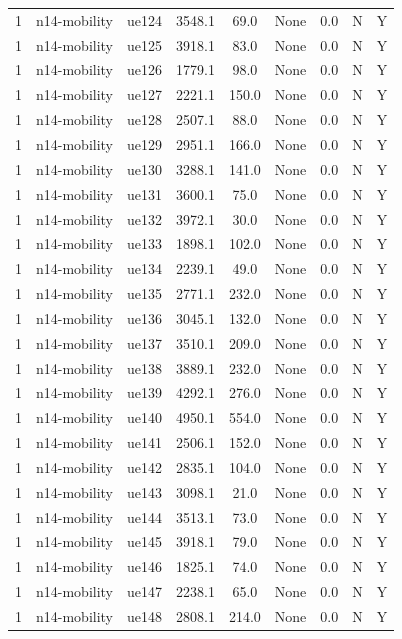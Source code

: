 \begin{table}[ht]
\begin{tabular}{|c|c|c|c|c|c|c|c|c|}
1 & n14-mobility & ue124 & 3548.1 & 69.0 & None & 0.0 & N & Y \\
1 & n14-mobility & ue125 & 3918.1 & 83.0 & None & 0.0 & N & Y \\
1 & n14-mobility & ue126 & 1779.1 & 98.0 & None & 0.0 & N & Y \\
1 & n14-mobility & ue127 & 2221.1 & 150.0 & None & 0.0 & N & Y \\
1 & n14-mobility & ue128 & 2507.1 & 88.0 & None & 0.0 & N & Y \\
1 & n14-mobility & ue129 & 2951.1 & 166.0 & None & 0.0 & N & Y \\
1 & n14-mobility & ue130 & 3288.1 & 141.0 & None & 0.0 & N & Y \\
1 & n14-mobility & ue131 & 3600.1 & 75.0 & None & 0.0 & N & Y \\
1 & n14-mobility & ue132 & 3972.1 & 30.0 & None & 0.0 & N & Y \\
1 & n14-mobility & ue133 & 1898.1 & 102.0 & None & 0.0 & N & Y \\
1 & n14-mobility & ue134 & 2239.1 & 49.0 & None & 0.0 & N & Y \\
1 & n14-mobility & ue135 & 2771.1 & 232.0 & None & 0.0 & N & Y \\
1 & n14-mobility & ue136 & 3045.1 & 132.0 & None & 0.0 & N & Y \\
1 & n14-mobility & ue137 & 3510.1 & 209.0 & None & 0.0 & N & Y \\
1 & n14-mobility & ue138 & 3889.1 & 232.0 & None & 0.0 & N & Y \\
1 & n14-mobility & ue139 & 4292.1 & 276.0 & None & 0.0 & N & Y \\
1 & n14-mobility & ue140 & 4950.1 & 554.0 & None & 0.0 & N & Y \\
1 & n14-mobility & ue141 & 2506.1 & 152.0 & None & 0.0 & N & Y \\
1 & n14-mobility & ue142 & 2835.1 & 104.0 & None & 0.0 & N & Y \\
1 & n14-mobility & ue143 & 3098.1 & 21.0 & None & 0.0 & N & Y \\
1 & n14-mobility & ue144 & 3513.1 & 73.0 & None & 0.0 & N & Y \\
1 & n14-mobility & ue145 & 3918.1 & 79.0 & None & 0.0 & N & Y \\
1 & n14-mobility & ue146 & 1825.1 & 74.0 & None & 0.0 & N & Y \\
1 & n14-mobility & ue147 & 2238.1 & 65.0 & None & 0.0 & N & Y \\
1 & n14-mobility & ue148 & 2808.1 & 214.0 & None & 0.0 & N & Y \\

\end{tabular}
\end{table}
